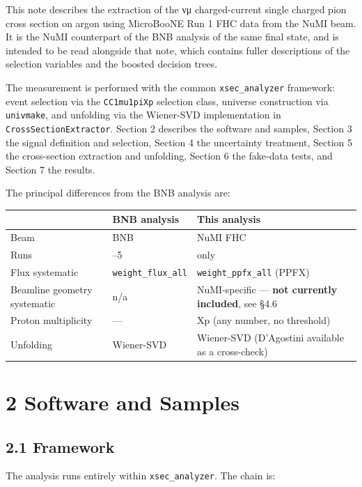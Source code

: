 \documentclass[11pt]{article}
\begin{document}
This note describes the extraction of the νμ charged-current single charged pion cross section on argon using MicroBooNE Run 1 FHC data from the NuMI beam. It is the NuMI counterpart of the BNB analysis of the same final state, and is intended to be read alongside that note, which contains fuller descriptions of the selection variables and the boosted decision trees.

The measurement is performed with the common \texttt{xsec\_analyzer} framework: event selection via the \texttt{CC1mu1piXp} selection class, universe construction via \texttt{univmake}, and unfolding via the Wiener-SVD implementation in \texttt{CrossSectionExtractor}. Section 2 describes the software and samples, Section 3 the signal definition and selection, Section 4 the uncertainty treatment, Section 5 the cross-section extraction and unfolding, Section 6 the fake-data tests, and Section 7 the results.

The principal differences from the BNB analysis are:

\begin{tabularx}{\textwidth}{|>{\raggedright\arraybackslash}X|>{\raggedright\arraybackslash}X|>{\raggedright\arraybackslash}X|}
\hline
\textbf{} & \textbf{BNB analysis} & \textbf{This analysis} \\
\hline
Beam & BNB & NuMI FHC \\
Runs & 1–5 & 1 only \\
Flux systematic & \texttt{weight\_flux\_all} & \texttt{weight\_ppfx\_all} (PPFX) \\
Beamline geometry systematic & n/a & NuMI-specific — \textbf{not currently included}, see §4.6 \\
Proton multiplicity & — & Xp (any number, no threshold) \\
Unfolding & Wiener-SVD & Wiener-SVD (D'Agostini available as a cross-check) \\
\hline
\end{tabularx}

\section*{2 Software and Samples}

\subsection*{2.1 Framework}

The analysis runs entirely within \texttt{xsec\_analyzer}. The chain is:
\end{document}
